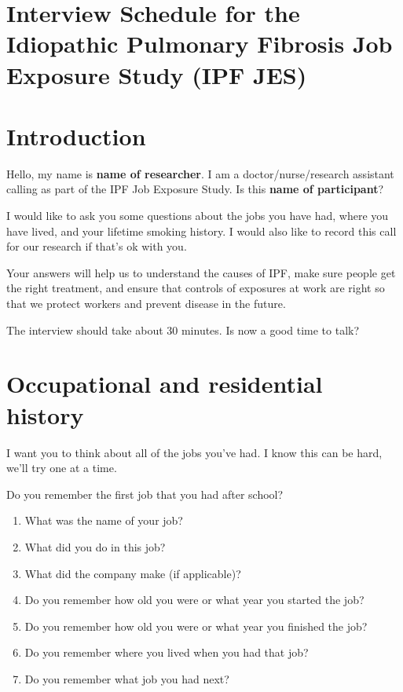\documentclass[a4paper,10pt]{article}
\begin{document}
 
 
 \pagestyle{fancy}
 
 


\section*{Interview Schedule for the Idiopathic Pulmonary Fibrosis Job Exposure Study (IPF JES)}


\section{Introduction}

Hello, my name is \textbf{name of researcher}. I am a doctor/nurse/research assistant calling as part of the IPF Job Exposure Study. Is this \textbf{name of participant}? 

I would like to ask you some questions about the jobs you have had, where you have lived, and your lifetime smoking history. I would also like to record this call for our research if that's ok with you.  

Your answers will help us to understand the causes of IPF, make sure people get the right treatment, and ensure that controls of exposures at work are right so that we protect workers and prevent disease in the future.  

The interview should take about 30 minutes. Is now a good time to talk?

\section{Occupational and residential history} 

I want you to think about all of the jobs you've had. I know this can be hard, we'll try one at a time. 

Do you remember the first job that you had after school?

\begin{enumerate}
\item  What was the name of your job?
\item  What did you do in this job?
\item  What did the company make (if applicable)?
\item  Do you remember how old you were or what year you started the job?
\item  Do you remember how old you were or what year you finished the job?
\item  Do you remember where you lived when you had that job?
\item  Do you remember what job you had next?
\end{enumerate}
\end{document}
